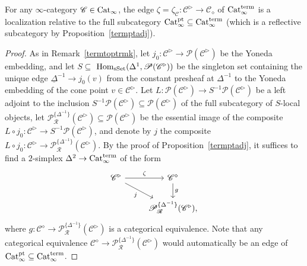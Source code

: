\documentclass{tac}
\newcommand{\s}[1]{\mathscr{#1}}
\newcommand{\tx}[1]{\textnormal{#1}}
\newcommand{\ul}[1]{\underline{#1}}
\begin{document}
\begin{proposition}\label{zetaisptlocalization} For any $\infty$-category $\s{C}\in \tx{Cat}_\infty$, the edge $\zeta = \zeta_{\s{C}} : \s{C}^\triangleright \to \s{C}_\diamond$ of $\tx{Cat}_\infty^{\tx{term}}$ is a localization relative to the full subcategory $\tx{Cat}_\infty^{\tx{pt}} \subseteq \tx{Cat}_\infty^{\tx{term}}$ (which is a reflective subcategory by Proposition~\ref{termptadj}).
\end{proposition}
\begin{proof} As in Remark~\ref{termtoptrmk}, let $j_0 : \s{C}^\triangleright \to \s{P}(\s{C}^\triangleright)$ be the Yoneda embedding, and let $S \subseteq$ $\tx{Hom}_{\tx{sSet}} (\Delta^1 , \s{P}(\s{C}^\triangleright))$ be the singleton set containing the unique edge $\ul{\Delta}^{-1} \to j_0 (v)$ from the constant presheaf at $\Delta^{-1}$ to the Yoneda embedding of the cone point $v \in \s{C}^\triangleright$.  Let $L : \s{P}(\s{C}^\triangleright ) \to S^{-1} \s{P}(\s{C}^\triangleright )$ be a left adjoint to the inclusion $S^{-1} \s{P}(\s{C}^\triangleright ) \subseteq \s{P}(\s{C}^\triangleright )$ of the full subcategory of $S$-local objects, let $\s{P}^{\{\Delta^{-1} \}}_\s{R} (\s{C}^\triangleright ) \subseteq \s{P}(\s{C}^\triangleright )$ be the essential image of the composite $L\circ j_0 : \s{C}^\triangleright \to S^{-1} \s{P}(\s{C}^\triangleright )$, and denote by $j$ the composite $L\circ j_0 : \s{C}^\triangleright \to \s{P}^{\{\Delta^{-1} \}}_\s{R} (\s{C}^\triangleright )$.  By the proof of Proposition~\ref{termptadj}, it suffices to find a $2$-simplex $\Delta^2 \to \tx{Cat}_\infty^\tx{term}$ of the form
\[\begin{tikzcd} \s{C}^\triangleright \arrow[]{r}{\zeta} \arrow[]{dr}[swap]{j}& \s{C}^\diamond \arrow[]{d}{g} \\
& \s{P}^{\{\Delta^{-1} \}}_\s{R} (\s{C}^\triangleright ), \end{tikzcd}\]
where $g : \s{C}^\diamond \to \s{P}^{\{\Delta^{-1} \}}_\s{R} (\s{C}^\triangleright )$ is a categorical equivalence.  Note that any categorical equivalence $\s{C}^\diamond \to \s{P}^{\{\Delta^{-1} \}}_\s{R} (\s{C}^\triangleright )$ would automatically be an edge of $\tx{Cat}_\infty^\tx{pt} \subseteq \tx{Cat}_\infty^\tx{term}$.  


\end{proof}
\end{document}
